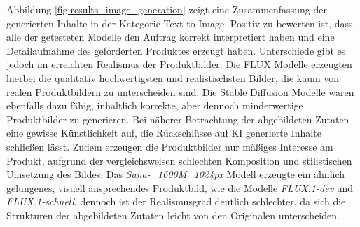 Abbildung \ref{fig:results_image_generation} zeigt eine Zusammenfassung der generierten Inhalte in der Kategorie Text-to-Image.
Positiv zu bewerten ist, dass alle der getesteten Modelle den Auftrag korrekt interpretiert haben und eine Detailaufnahme des geforderten Produktes erzeugt haben.
Unterschiede gibt es jedoch im erreichten Realismus der Produktbilder.
Die FLUX Modelle erzeugten hierbei die qualitativ hochwertigsten und realistischsten Bilder, die kaum von realen Produktbildern zu unterscheiden sind.
Die Stable Diffusion Modelle waren ebenfalls dazu fähig, inhaltlich korrekte, aber dennoch minderwertige Produktbilder zu generieren.
Bei näherer Betrachtung der abgebildeten Zutaten eine gewisse Künstlichkeit auf, die Rückschlüsse auf KI generierte Inhalte schließen lässt.
Zudem erzeugen die Produktbilder nur mäßiges Interesse am Produkt, aufgrund der vergleichsweisen schlechten Komposition und stilistischen Umsetzung des Bildes.
Das \textit{Sana-\_1600M\_1024px} Modell erzeugte ein ähnlich gelungenes, visuell ansprechendes Produktbild, wie die Modelle \textit{FLUX.1-dev} und \textit{FLUX.1-schnell}, dennoch ist der Realismusgrad deutlich schlechter, da sich die Strukturen der abgebildeten Zutaten leicht von den Originalen unterscheiden.

